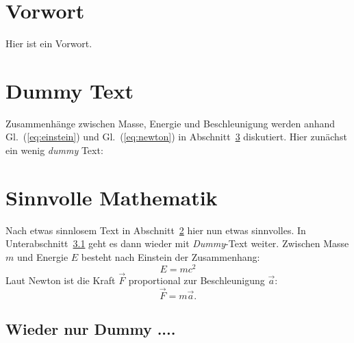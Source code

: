 \documentclass[12pt,a4paper]{article}
\newcommand{\sectionref}[1]{Abschnitt~\ref{#1}}
\newcommand{\subsectionref}[1]{Unterabschnitt~\ref{#1}}
\newcommand{\equationref}[1]{Gl.~(\ref{#1})}
\begin{document}
%
\tableofcontents
%
\section{Vorwort}
Hier ist ein Vorwort.
%
\section{Dummy Text}
\label{sec:dummy}
%
Zusammenhänge zwischen Masse, Energie und Beschleunigung werden anhand
Gl.~(\ref{eq:einstein}) und \equationref{eq:newton}
in \sectionref{sec:mathe} diskutiert. Hier zunächst ein wenig
\emph{dummy} Text:
 
\blindtext[3]
\section{Sinnvolle Mathematik}
\label{sec:mathe}
%
Nach etwas sinnlosem Text in Abschnitt~\ref{sec:dummy} hier nun etwas
sinnvolles. In \subsectionref{subsec:nochmal_dummy} geht es dann
wieder mit \emph{Dummy}-Text weiter. Zwischen Masse $m$ und Energie
$E$ besteht nach Einstein der Zusammenhang:
%
\begin{equation}
  \label{eq:einstein}
  E=mc^{2}
\end{equation}
Laut Newton ist die Kraft $\vec{F}$ proportional zur Beschleunigung
$\vec{a}$:
%
\begin{equation}
  \label{eq:newton}
  \vec{F}=m\vec{a}.
\end{equation}
%
\subsection{Wieder nur Dummy ....}
\label{subsec:nochmal_dummy}
%
\blindtext
%
\end{document}
